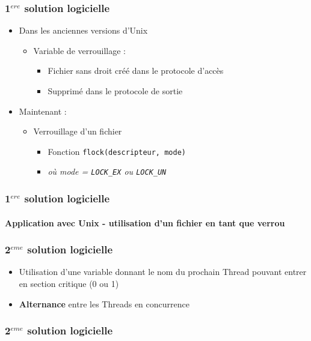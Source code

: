 \begin{frame}
\frametitle{1$^{ere}$ solution logicielle}
\begin{itemize}
\item Dans les anciennes versions d’Unix
\begin{itemize}
\item Variable de verrouillage :
\begin{itemize}
\item Fichier sans droit créé dans le protocole d’accès
\item Supprimé dans le protocole de sortie
\end{itemize}
\end{itemize}
\item Maintenant :
\begin{itemize}
\item Verrouillage d’un fichier
\begin{itemize}
\item Fonction \texttt{flock(descripteur, mode)}
\item \textit{où mode = \texttt{LOCK\_EX} ou \texttt{LOCK\_UN}}
\end{itemize}
\end{itemize}
\end{itemize}
\end{frame}

\begin{frame}
\frametitle{1$^{ere}$ solution logicielle}
\framesubtitle{Application avec Unix - utilisation d'un fichier en tant que verrou}
\begin{scriptsize}\end{scriptsize}
\end{frame}

\begin{frame}
\frametitle{2$^{eme}$ solution logicielle}
\begin{itemize}
\item Utilisation d’une variable donnant le nom du prochain Thread pouvant entrer en section critique (0 ou 1)
\item \textbf{Alternance} entre les Threads en concurrence
\end{itemize}
\end{frame}

\begin{frame}
\frametitle{2$^{eme}$ solution logicielle}
\begin{scriptsize}\end{scriptsize}
\end{frame}

